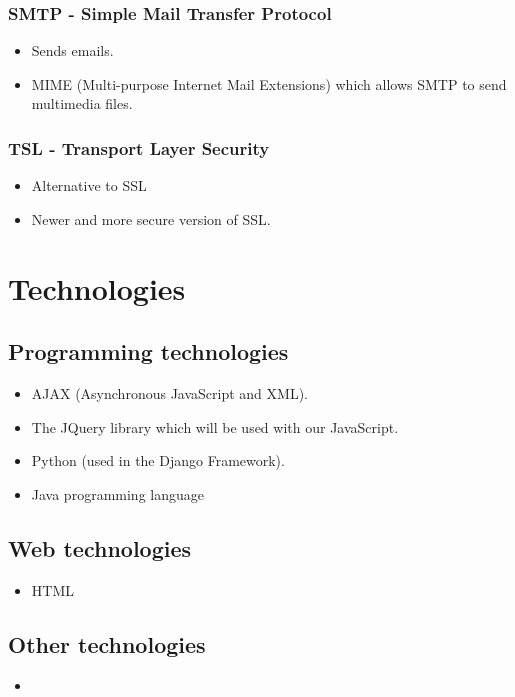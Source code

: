 \documentclass[12pt, oneside]{article}
\begin{document}
		\subsubsection{SMTP - Simple Mail Transfer Protocol}
			\begin{itemize}
				\item Sends emails.
				\item MIME (Multi-purpose Internet Mail Extensions) which allows SMTP to send multimedia files.
			\end{itemize}
		\subsubsection{TSL - Transport Layer Security}
			\begin{itemize}
				\item Alternative to SSL
				\item Newer and more secure version of SSL.
			\end{itemize}
		
\section{Technologies}
	\subsection{Programming technologies}
		\begin{itemize}
			\item AJAX (Asynchronous JavaScript and XML).
			\item The JQuery library which will be used with our JavaScript.
			\item Python (used in the Django Framework).
			\item Java programming language 
		\end{itemize}
	\subsection{Web technologies}
		\begin{itemize}
			\item HTML
		\end{itemize}
	\subsection{Other technologies}
		\begin{itemize}
			\item
		\end{itemize}
\end{document}
